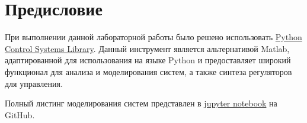 \tableofcontents
\section*{Предисловие}
При выполнении данной лабораторной работы было решено использовать 
\href{https://python-control.readthedocs.io/en/0.9.4/}{Python Control Systems Library}.
Данный инструмент является альтернативой Matlab, адаптированной для использования на 
языке Python и предоставляет широкий функционал для анализа и моделирования систем,
а также синтеза регуляторов для управления.

Полный листинг моделирования систем представлен в \href{https://github.com/diuzhevVlad/control-theory-itmo-fall-2023/blob/main/Lab10/Lab10.ipynb}{jupyter notebook} на GitHub.

\pagebreak

